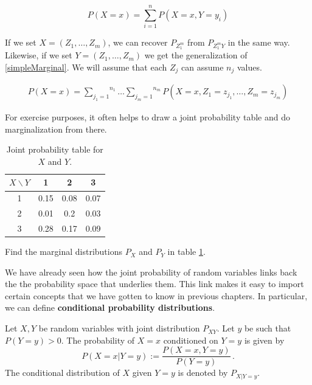 \begin{equation} \label{simpleMarginal}
P(X=x) = \overset{n}{\underset{i=1}{\sum}} P(X=x,Y=y_{i}) 
\end{equation}

If we set $ X = (Z_{1}, \ldots, Z_{m}) $, we can recover $ P_{Z_{1}^{m}} $ from $ P_{Z_{1}^{m}Y} $ in the same way. Likewise,
if we set $ Y = (Z_{1}, \ldots, Z_{m}) $ we get the generalization of \eqref{simpleMarginal}. We will assume that each $ Z_{j} $
can assume $ n_{j} $ values.

\begin{align}
P(X=x) = \overset{n_{1}}{\underset{j_{1}=1}{\sum}}\ldots \overset{n_{m}}{\underset{j_{m}=1}{\sum}} 
P(X=x,Z_{1}=z_{j_{1}}, \ldots, Z_{m}=z_{j_{m}})
\end{align}

For exercise purposes, it often helps to draw a joint probability table and do marginalization from there.

\begin{table}
\center
\begin{tabular}{|c|c|c|c|}
\hline
$X\backslash Y$	& 1		& 2		& 3		\\
\hline
1				& 0.15	& 0.08	& 0.07	\\
2				& 0.01	& 0.2	& 0.03	\\	
3				& 0.28	& 0.17	& 0.09	\\
\hline
\end{tabular}
\caption{Joint probability table for $ X $ and $ Y $.}
\label{jointTable}
\end{table}

\begin{Exercise}
Find the marginal distributions $ P_X $ and $ P_{Y} $ in table \ref{jointTable}.
\end{Exercise}

We have already seen how the joint probability of random variables links back the the probability space that underlies them.
This link makes it easy to import certain concepts that we have
gotten to know in previous chapters. In particular, we can define \textbf{conditional probability distributions}.

\begin{Definition}
Let $X,Y$ be random variables with joint distribution $P_{XY}$. Let
$y$ be such that $P(Y=y)>0$. The probability of $ X = x $ conditioned on $ Y=y $ is given by
$$ P(X=x|Y=y) := \dfrac{P(X=x, Y=y)}{P(Y=y)} \, . $$
The conditional distribution of $X$ given $Y=y$ is denoted by $P_{X|Y=y}$.
\end{Definition} 

